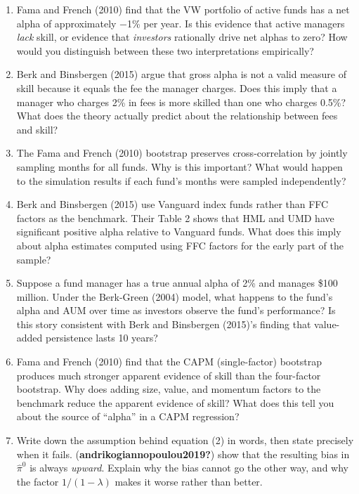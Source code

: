 \documentclass[
  letterpaper,
  DIV=11,
  numbers=noendperiod]{scrartcl}
\begin{document}
\begin{enumerate}
\def\labelenumi{\arabic{enumi}.}
\item
  Fama and French (2010) find that the VW portfolio of active funds has
  a net alpha of approximately −1\% per year. Is this evidence that
  active managers \emph{lack} skill, or evidence that \emph{investors}
  rationally drive net alphas to zero? How would you distinguish between
  these two interpretations empirically?
\item
  Berk and Binsbergen (2015) argue that gross alpha is not a valid
  measure of skill because it equals the fee the manager charges. Does
  this imply that a manager who charges 2\% in fees is more skilled than
  one who charges 0.5\%? What does the theory actually predict about the
  relationship between fees and skill?
\item
  The Fama and French (2010) bootstrap preserves cross-correlation by
  jointly sampling months for all funds. Why is this important? What
  would happen to the simulation results if each fund's months were
  sampled independently?
\item
  Berk and Binsbergen (2015) use Vanguard index funds rather than FFC
  factors as the benchmark. Their Table 2 shows that HML and UMD have
  significant positive alpha relative to Vanguard funds. What does this
  imply about alpha estimates computed using FFC factors for the early
  part of the sample?
\item
  Suppose a fund manager has a true annual alpha of 2\% and manages
  \$100 million. Under the Berk-Green (2004) model, what happens to the
  fund's alpha and AUM over time as investors observe the fund's
  performance? Is this story consistent with Berk and Binsbergen
  (2015)'s finding that value-added persistence lasts 10 years?
\item
  Fama and French (2010) find that the CAPM (single-factor) bootstrap
  produces much stronger apparent evidence of skill than the four-factor
  bootstrap. Why does adding size, value, and momentum factors to the
  benchmark reduce the apparent evidence of skill? What does this tell
  you about the source of ``alpha'' in a CAPM regression?
\item
  Write down the assumption behind equation (2) in words, then state
  precisely when it fails. (\textbf{andrikogiannopoulou2019?}) show that
  the resulting bias in \(\hat\pi^0\) is always \emph{upward}. Explain
  why the bias cannot go the other way, and why the factor
  \(1/(1-\lambda)\) makes it worse rather than better.

\end{enumerate}
\end{document}
